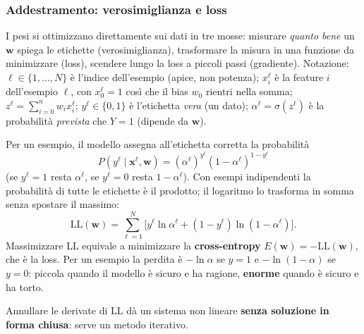 \documentclass[12pt]{extarticle}
\begin{document}
\subsubsection{Addestramento: verosimiglianza e loss}

\noindent I pesi si ottimizzano direttamente sui dati in tre mosse: misurare \emph{quanto bene} un $\mathbf{w}$ spiega le etichette (verosimiglianza), trasformare la misura in una funzione da minimizzare (loss), scendere lungo la loss a piccoli passi (gradiente). Notazione: $\ell\in\{1,\dots,N\}$ è l'indice dell'esempio (apice, non potenza); $x_i^\ell$ è la feature $i$ dell'esempio $\ell$, con $x_0^\ell=1$ così che il bias $w_0$ rientri nella somma; $z^\ell=\sum_{i=0}^n w_i x_i^\ell$; $y^\ell\in\{0,1\}$ è l'etichetta \emph{vera} (un dato); $\alpha^\ell=\sigma(z^\ell)$ è la probabilità \emph{prevista} che $Y{=}1$ (dipende da $\mathbf{w}$).

\noindent Per un esempio, il modello assegna all'etichetta corretta la probabilità
\[
P(y^\ell\mid\mathbf{x}^\ell,\mathbf{w})=(\alpha^\ell)^{y^\ell}(1-\alpha^\ell)^{1-y^\ell}
\]
(se $y^\ell=1$ resta $\alpha^\ell$, se $y^\ell=0$ resta $1-\alpha^\ell$). Con esempi indipendenti la probabilità di tutte le etichette è il prodotto; il logaritmo lo trasforma in somma senza spostare il massimo:
\[
\mathrm{LL}(\mathbf{w})=\sum_{\ell=1}^N\Big[y^\ell\ln\alpha^\ell+(1-y^\ell)\ln(1-\alpha^\ell)\Big].
\]
Massimizzare $\mathrm{LL}$ equivale a minimizzare la \textbf{cross-entropy} $E(\mathbf{w})=-\mathrm{LL}(\mathbf{w})$, che è la loss. Per un esempio la perdita è $-\ln\alpha$ se $y=1$ e $-\ln(1-\alpha)$ se $y=0$: piccola quando il modello è sicuro e ha ragione, \textbf{enorme} quando è sicuro e ha torto.

\begin{center}
\end{center}

\noindent Annullare le derivate di $\mathrm{LL}$ dà un sistema non lineare \textbf{senza soluzione in forma chiusa}: serve un metodo iterativo.
\end{document}

